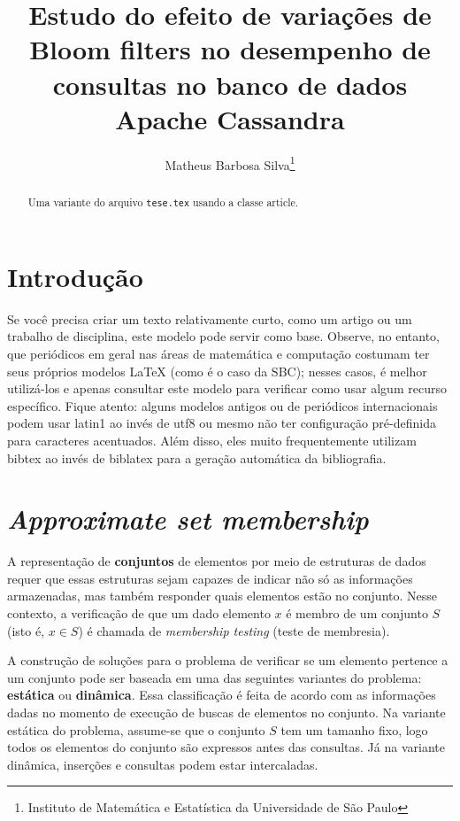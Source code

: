 \documentclass[12pt,twoside,english,brazilian]{article}
\title{Estudo do efeito de variações de Bloom filters no desempenho de consultas no banco de dados Apache Cassandra}
\author{
  Matheus Barbosa Silva\thanks{Instituto de Matemática e Estatística da Universidade de São Paulo}
}
\date{}
\begin{document}
\maketitle

\begin{abstract}
  Uma variante do arquivo \texttt{tese.tex} usando a classe \textsf{article}.
\end{abstract}

\section{Introdução}

Se você precisa criar um texto relativamente curto, como um artigo ou
um trabalho de disciplina, este modelo pode servir como base. Observe,
no entanto, que periódicos em geral nas áreas de matemática e computação
costumam ter seus próprios modelos \LaTeX{} (como é o caso da
SBC\nocite{sbctemplate});
nesses casos, é melhor utilizá-los e apenas consultar este modelo para
verificar como usar algum recurso específico. Fique atento: alguns modelos
antigos ou de periódicos internacionais podem usar \textsf{latin1} ao
invés de \textsf{utf8} ou mesmo não ter configuração pré-definida para
caracteres acentuados. Além disso, eles muito frequentemente utilizam
bibtex ao invés de biblatex para a geração automática da bibliografia.

\printbibliography[
  title=\refname\label{bibliografia}, %
]

\newpage

\section{\textit{Approximate set membership}}

A representação de \textbf{conjuntos} de elementos por meio de estruturas de dados requer que essas estruturas sejam capazes de indicar não só as informações armazenadas, mas também responder quais elementos estão no conjunto. Nesse contexto, a verificação de que um dado elemento $x$ é membro de um conjunto $S$ (isto é, $x \in S$) é chamada de \textit{membership testing} (teste de membresia).

A construção de soluções para o problema de verificar se um elemento pertence a um conjunto pode ser baseada em uma das seguintes variantes do problema: \textbf{estática} ou \textbf{dinâmica}. Essa classificação é feita de acordo com as informações dadas no momento de execução de buscas de elementos no conjunto. Na variante estática do problema, assume-se que o conjunto $S$ tem um tamanho fixo, logo todos os elementos do conjunto são expressos antes das consultas. Já na variante dinâmica, inserções e consultas podem estar intercaladas.
\end{document}
